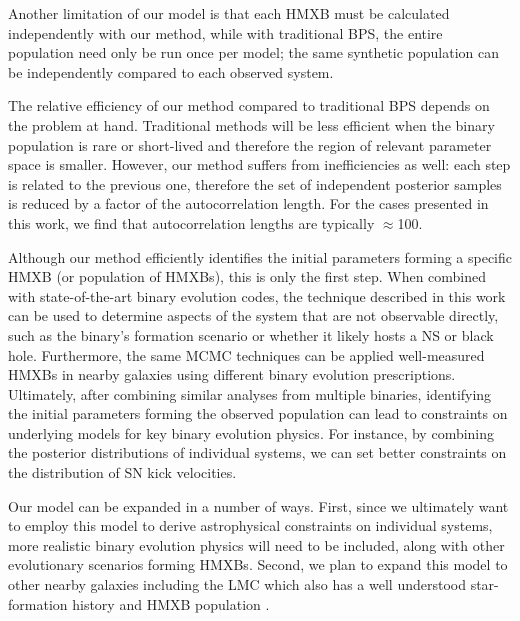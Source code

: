 \documentclass[usenatbib]{mnras}
\begin{document}
Another limitation of our model is that each HMXB must be calculated independently with our method, while with traditional BPS, the entire population need only be run once per model; the same synthetic population can be independently compared to each observed system.


The relative efficiency of our method compared to traditional BPS depends on the problem at hand. Traditional methods will be less efficient when the binary population is rare or short-lived and therefore the region of relevant parameter space is smaller. However, our method suffers from inefficiencies as well: each step is related to the previous one, therefore the set of independent posterior samples is reduced by a factor of the autocorrelation length. For the cases presented in this work, we find that autocorrelation lengths are typically $\approx$100. 


Although our method efficiently identifies the initial  parameters forming a specific HMXB (or population of HMXBs), this is only the first step. When combined with state-of-the-art binary evolution codes, the technique described in this work can be used to determine aspects of the system that are not observable directly, such as the binary’s formation scenario or whether it likely hosts a NS or black hole. Furthermore, the same MCMC techniques can be applied well-measured HMXBs in nearby galaxies using different binary evolution prescriptions. Ultimately, after combining similar analyses from multiple binaries, identifying the initial parameters forming the observed population can lead to constraints on underlying models for key binary evolution physics. For instance, by combining the posterior distributions of individual systems, we can set better constraints on the distribution of SN kick velocities.



Our model can be expanded in a number of ways. First, since we ultimately want to employ this model to derive astrophysical constraints on individual systems, more realistic binary evolution physics will need to be included, along with other evolutionary scenarios forming HMXBs. Second, we plan to expand this model to other nearby galaxies including the LMC which also has a well understood star-formation history \citep{harris09} and HMXB population \citep[e.g.,][]{antoniou16}. 
\end{document}
